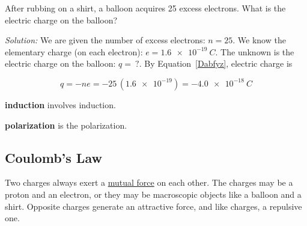 \documentclass[dvipsnames]{article}
\begin{document}
\begin{example}
    After rubbing on a shirt, a balloon acquires 25 excess electrons. What is the electric charge on the balloon?
\end{example}

\textit{Solution:}
We are given the number of excess electrons: $n = 25$. We know the elementary charge (on each electron): $e = \SI{1.6e-19}{C}$. The unknown is the electric charge on the balloon: $q =\ ?$. By Equation~\ref{Dabfyz}, electric charge is

\begin{equation*}
    q = - n e = -25\,(\num{1.6e-19}) = \SI{-4.0e-18}{C}
\end{equation*}

\textbf{\Gls{induction}} involves \glsdesc{induction}.

\textbf{\Gls{polarization}} is the \glsdesc{polarization}.

\subsection{Coulomb's Law}

Two charges always exert a \href{https://phet.colorado.edu/en/simulations/coulombs-law}{mutual force} on each other. The charges may be a proton and an electron, or they may be macroscopic objects like a balloon and a shirt. Opposite charges generate an attractive force, and like charges, a repulsive one. 


\def\distanceA{5}
\def\distanceR{2}
\end{document}
